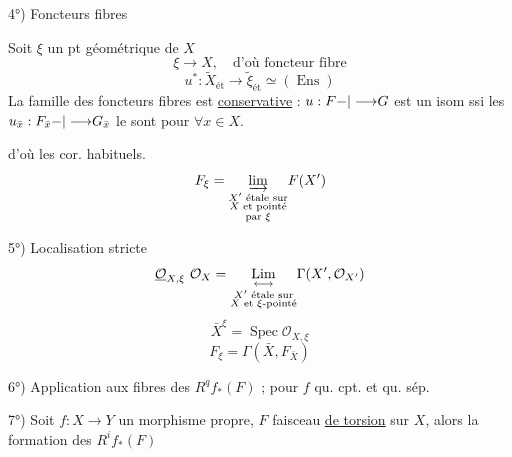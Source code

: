 \margin{\ldots}

4°) Foncteurs fibres

Soit $\xi$ un pt géométrique de $X$
\[
\xi\longrightarrow X,\quad\text{d'où foncteur fibre}
\]
\[
u^*:\widetilde X_{\mathrm{ét}}\longrightarrow\widetilde\xi_{\mathrm{ét}}\simeq(\operatorname{Ens})
\]
La famille des foncteurs fibres est \uline{conservative} : $u:F{-|\longrightarrow}G$ est un isom ssi les $u_{\bar x}:F_{\bar x}{-|\longrightarrow}G_{\bar x}$ le sont pour $\forall x\in X$.

d'où les cor. habituels.
\[
F_\xi=\underset{\substack{X'\text{ étale sur}\\X\text{ et pointé}\\\text{par }\xi}}{{\varinjlim}}F(X')
\]

5°) Localisation stricte
\[
\underline{\mathcal O}_{X,\xi}\ \deleted{\unsure{\mathcal O_X}}
=\underset{\substack{X'\text{ étale sur}\\X\text{ et }\xi\text{-pointé}}}
{\unsure{\mathop{\mathrm{Lim}}\limits_{\longleftrightarrow}}}
\Gamma(X',\mathcal O_{X'})
\]
\[
\bar X^\xi=\operatorname{Spec}\mathcal O_{X,\xi}
\]
\[
F_\xi=\Gamma(\bar X,F_{\bar X})
\]

6°) Application aux fibres des $R^q f_*(F)$ ; pour $f$ qu. cpt. et qu. sép.



7°)  Soit $f:X\longrightarrow Y$ un morphisme propre, $F$ faisceau \uline{de torsion} sur $X$, alors la formation des $R^i f_*(F)$
